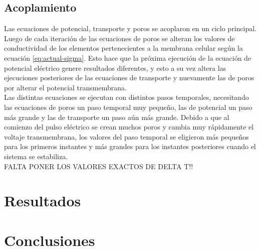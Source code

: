 \documentclass[a4paper,10pt]{article}
\begin{document}
\subsection{Acoplamiento}
Las ecuaciones de potencial, transporte y poros se acoplaron en un ciclo principal. Luego de cada iteración de las ecuaciones de poros se alteran los valores de conductividad de los elementos pertenecientes a la membrana celular según la ecuación \ref{eq:actual-sigma}. Esto hace que la próxima ejecución de la ecuación de potencial eléctrico genere resultados diferentes, y esto a su vez altera las ejecuciones posteriores de las ecuaciones de transporte y nuevamente las de poros por alterar el potencial transmembrana.\\

Las distintas ecuaciones se ejecutan con distintos pasos temporales, necesitando las ecuaciones de poros un paso temporal muy pequeño, las de potencial un paso más grande y las de transporte un paso aún más grande. Debido a que al comienzo del pulso eléctrico se crean muchos poros y cambia muy rápidamente el voltaje transmembrana, los valores del paso temporal se eligieron más pequeños para los primeros instantes y más grandes para los instantes posteriores cuando el sistema se estabiliza.\\

FALTA PONER LOS VALORES EXACTOS DE DELTA T!!

\section{Resultados}

\section{Conclusiones}
\end{document}
